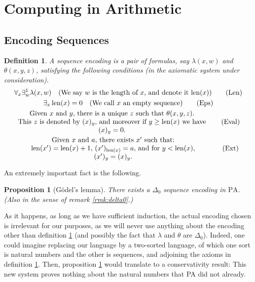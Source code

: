 \documentclass{article}
\newtheorem{prop}[theorem]{Proposition}
\newtheorem{definition}[theorem]{Definition}
\theoremstyle{nonumberplain}
\newcommand{\PA}{\mathrm{PA}}
\DeclareMathOperator{\len}{len}
\begin{document}
\section{Computing in Arithmetic}

\subsection{Encoding Sequences}

\begin{definition}\label{def:seqenc}
A \emph{sequence encoding} is a pair of formulas, say $\lambda(x,w)$ and $\theta(x,y,z)$, satisfying the following conditions (in the axiomatic system under consideration).
\begin{gather}
\forall_x \exists^1_w \lambda(x,w) \quad\text{(We say $w$ is the length of $x$, and denote it $\len(x)$)} \tag{Len}\\
\exists_x \len(x) = 0 \quad\text{(We call $x$ an empty sequence)} \tag{Eps} \label{ax:eps}\\
\parbox{0.8\linewidth}{\centering Given $x$ and $y$, there is a unique $z$ such that $\theta(x,y,z)$. \\ This $z$ is denoted by $(x)_y$, and moreover if $y \geq \len(x)$ we have $(x)_y = 0$.} \tag{Eval}\\
\parbox{0.8\linewidth}{\centering Given $x$ and $a$, there exists $x'$ such that: \\ $\len(x') = \len(x) + 1$, $(x')_{\len(x)} = a$, and for $y < \len(x)$, $(x')_y = (x)_y$.} \tag{Ext}\label{ax:ext}
\end{gather}
\end{definition}

An extremely important fact is the following.

\begin{prop}[Gödel's lemma]\label{prop:godellemma}
There exists a $\Delta_0$ sequence encoding in $\PA$. (Also in the sense of remark \ref{rmk:delta0}.)
\end{prop}

As it happens, as long as we have sufficient induction, the actual encoding chosen is irrelevant for our purposes, as we will never use anything about the encoding other than definition \ref{def:seqenc} (and possibly the fact that $\lambda$ and $\theta$ are $\Delta_0$). Indeed, one could imagine replacing our language by a two-sorted language, of which one sort is natural numbers and the other is sequences, and adjoining the axioms in definition \ref{def:seqenc}. Then, proposition \ref{prop:godellemma} would translate to a conservativity result: This new system proves nothing about the natural numbers that PA did not already.
\end{document}
